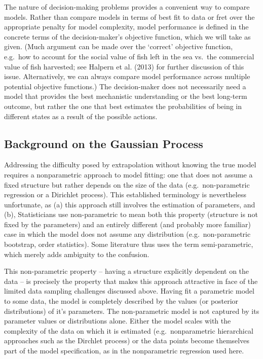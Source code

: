 \documentclass[author-year, review]{elsarticle} %
\begin{document}
The nature of decision-making problems provides a convenient way to
compare models. Rather than compare models in terms of best fit to data
or fret over the appropriate penalty for model complexity, model
performance is defined in the concrete terms of the decision-maker's
objective function, which we will take as given. (Much argument can be
made over the `correct' objective function, e.g.~how to account for the
social value of fish left in the sea vs.~the commercial value of fish
harvested; see Halpern et al. (2013) for further discussion of this
issue. Alternatively, we can always compare model performance across
multiple potential objective functions.) The decision-maker does not
necessarily need a model that provides the best mechanistic
understanding or the best long-term outcome, but rather the one that
best estimates the probabilities of being in different states as a
result of the possible actions.

\subsection{Background on the Gaussian
Process}\label{background-on-the-gaussian-process}

Addressing the difficulty posed by extrapolation without knowing the
true model requires a nonparametric approach to model fitting: one that
does not assume a fixed structure but rather depends on the size of the
data (e.g.~non-parametric regression or a Dirichlet process). This
established terminology is nevertheless unfortunate, as (a) this
approach still involves the estimation of parameters, and (b),
Statisticians use non-parametric to mean both this property (structure
is not fixed by the parameters) and an entirely different (and probably
more familiar) case in which the model does not assume any distribution
(e.g.~non-parametric bootstrap, order statistics). Some literature thus
uses the term semi-parametric, which merely adds ambiguity to the
confusion.

This non-parametric property -- having a structure explicitly dependent
on the data -- is precisely the property that makes this approach
attractive in face of the limited data sampling challenges discussed
above. Having fit a parametric model to some data, the model is
completely described by the values (or posterior distributions) of it's
parameters. The non-parametric model is not captured by its parameter
values or distributions alone. Either the model scales with the
complexity of the data on which it is estimated (e.g.~nonparametric
hierarchical approaches such as the Dirchlet process) or the data points
become themselves part of the model specification, as in the
nonparametric regression used here.
\end{document}
